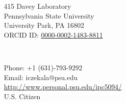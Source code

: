 \parbox[t]{3in}{
\begin{flushleft}
415 Davey Laboratory\\
Pennsylvania State University\\
University Park, PA 16802\\
ORCID ID: \href{http://orcid.org/0000-0002-1483-8811}{0000-0002-1483-8811} \\
\end{flushleft}} \ \hfill  \
\parbox[t]{3in}{
\begin{flushright}
Phone: +1 (631)-793-9292\\
Email: iczekala@psu.edu\\
\url{http://www.personal.psu.edu/ipc5094/}\\
U.S. Citizen
\end{flushright}}
